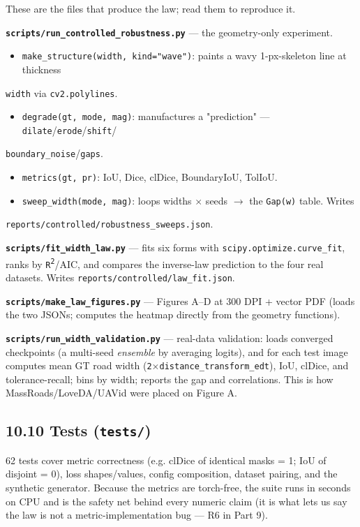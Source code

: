 \documentclass[11pt]{article}
\begin{document}
These are the files that produce the law; read them to reproduce it.

\textbf{\texttt{scripts/run\_controlled\_robustness.py}} --- the geometry-only experiment.
\begin{itemize}\setlength{\itemsep}{1pt}
\item \texttt{make\_structure(width, kind="wave")}: paints a wavy 1-px-skeleton line at thickness
\end{itemize}
  \texttt{width} via \texttt{cv2.polylines}.
\begin{itemize}\setlength{\itemsep}{1pt}
\item \texttt{degrade(gt, mode, mag)}: manufactures a "prediction" --- \texttt{dilate}/\texttt{erode}/\texttt{shift}/
\end{itemize}
  \texttt{boundary\_noise}/\texttt{gaps}.
\begin{itemize}\setlength{\itemsep}{1pt}
\item \texttt{metrics(gt, pr)}: IoU, Dice, clDice, BoundaryIoU, TolIoU.
\item \texttt{sweep\_width(mode, mag)}: loops widths $\times$ seeds $\rightarrow$ the \texttt{Gap(w)} table. Writes
\end{itemize}
  \texttt{reports/controlled/robustness\_sweeps.json}.

\textbf{\texttt{scripts/fit\_width\_law.py}} --- fits six forms with \texttt{scipy.optimize.curve\_fit}, ranks by \texttt{R\textsuperscript{2}}/AIC, and compares the inverse-law prediction to the four real datasets. Writes \texttt{reports/controlled/law\_fit.json}.

\textbf{\texttt{scripts/make\_law\_figures.py}} --- Figures A--D at 300 DPI + vector PDF (loads the two JSONs; computes the heatmap directly from the geometry functions).

\textbf{\texttt{scripts/run\_width\_validation.py}} --- real-data validation: loads converged checkpoints (a multi-seed \textit{ensemble} by averaging logits), and for each test image computes mean GT road width (\texttt{2$\times$distance\_transform\_edt}), IoU, clDice, and tolerance-recall; bins by width; reports the gap and correlations. This is how MassRoads/LoveDA/UAVid were placed on Figure A.

\subsection*{10.10 Tests (\texttt{tests/})}

62 tests cover metric correctness (e.g. clDice of identical masks = 1; IoU of disjoint = 0), loss shapes/values, config composition, dataset pairing, and the synthetic generator. Because the metrics are torch-free, the suite runs in seconds on CPU and is the safety net behind every numeric claim (it is what lets us say the law is not a metric-implementation bug --- R6 in Part 9).
\end{document}
